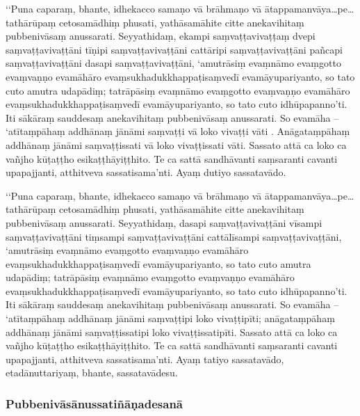‘‘Puna caparaṃ, bhante, idhekacco samaṇo vā brāhmaṇo vā ātappamanvāya…pe… tathārūpaṃ cetosamādhiṃ phusati, yathāsamāhite citte anekavihitaṃ pubbenivāsaṃ anussarati. Seyyathidaṃ, ekampi saṃvaṭṭavivaṭṭaṃ dvepi saṃvaṭṭavivaṭṭāni tīṇipi saṃvaṭṭavivaṭṭāni cattāripi saṃvaṭṭavivaṭṭāni pañcapi saṃvaṭṭavivaṭṭāni dasapi saṃvaṭṭavivaṭṭāni, ‘amutrāsiṃ evaṃnāmo evaṃgotto evaṃvaṇṇo evamāhāro evaṃsukhadukkhappaṭisaṃvedī evamāyupariyanto, so tato cuto amutra udapādiṃ; tatrāpāsiṃ evaṃnāmo evaṃgotto evaṃvaṇṇo evamāhāro evaṃsukhadukkhappaṭisaṃvedī evamāyupariyanto, so tato cuto idhūpapanno’ti. Iti sākāraṃ sauddesaṃ anekavihitaṃ pubbenivāsaṃ anussarati. So evamāha – ‘atītaṃpāhaṃ addhānaṃ jānāmi saṃvaṭṭi vā loko vivaṭṭi vāti . Anāgataṃpāhaṃ addhānaṃ jānāmi saṃvaṭṭissati vā loko vivaṭṭissati vāti. Sassato attā ca loko ca vañjho kūṭaṭṭho esikaṭṭhāyiṭṭhito. Te ca sattā sandhāvanti saṃsaranti cavanti upapajjanti, atthitveva sassatisama’nti. Ayaṃ dutiyo sassatavādo.

‘‘Puna caparaṃ, bhante, idhekacco samaṇo vā brāhmaṇo vā ātappamanvāya…pe… tathārūpaṃ cetosamādhiṃ phusati, yathāsamāhite citte anekavihitaṃ pubbenivāsaṃ anussarati. Seyyathidaṃ, dasapi saṃvaṭṭavivaṭṭāni vīsampi saṃvaṭṭavivaṭṭāni tiṃsampi saṃvaṭṭavivaṭṭāni cattālīsampi saṃvaṭṭavivaṭṭāni, ‘amutrāsiṃ evaṃnāmo evaṃgotto evaṃvaṇṇo evamāhāro evaṃsukhadukkhappaṭisaṃvedī evamāyupariyanto, so tato cuto amutra udapādiṃ; tatrāpāsiṃ evaṃnāmo evaṃgotto evaṃvaṇṇo evamāhāro evaṃsukhadukkhappaṭisaṃvedī evamāyupariyanto, so tato cuto idhūpapanno’ti. Iti sākāraṃ sauddesaṃ anekavihitaṃ pubbenivāsaṃ anussarati. So evamāha – ‘atītaṃpāhaṃ addhānaṃ jānāmi saṃvaṭṭipi loko vivaṭṭipīti; anāgataṃpāhaṃ addhānaṃ jānāmi saṃvaṭṭissatipi loko vivaṭṭissatipīti. Sassato attā ca loko ca vañjho kūṭaṭṭho esikaṭṭhāyiṭṭhito. Te ca sattā sandhāvanti saṃsaranti cavanti upapajjanti, atthitveva sassatisama’nti. Ayaṃ tatiyo sassatavādo, etadānuttariyaṃ, bhante, sassatavādesu.

\subsubsection{Pubbenivāsānussatiñāṇadesanā}

